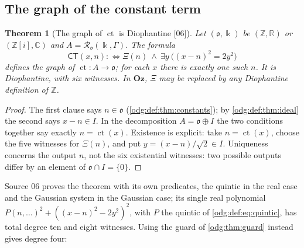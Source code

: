 \documentclass[11pt,oneside]{article}
\numberwithin{equation}{section}
\newtheorem{theorem}{Theorem}[section]
\theoremstyle{definition}
\theoremstyle{remark}
\newcommand{\Oz}{\mathbf{Oz}}
\newcommand{\Z}{\mathbb Z}
\newcommand{\R}{\mathbb R}
\newcommand{\C}{\mathbb C}
\newcommand{\ct}{\operatorname{ct}}
\newcommand{\src}[1]{\textup{\textsf{\small[#1]}}}
\begin{document}
\subsection{The graph of the constant term}

\begin{theorem}[The graph of $\ct$ is Diophantine \src{06}]\label{odg:def:thm:ctgraph}
Let $(\mathfrak o,\Bbbk)$ be $(\Z,\R)$ or $(\Z[i],\C)$ and
$A=\mathcal R_{\mathfrak o}(\Bbbk,\Gamma)$. The formula
\begin{equation}\label{odg:def:eq:ctgraph}
 \mathsf{CT}(x,n):\Longleftrightarrow\Xi(n)\ \wedge\ \exists y\
 \bigl((x-n)^2=2y^2\bigr)
\end{equation}
defines the graph of $\ct:A\to\mathfrak o$; for each $x$ there is exactly one
such $n$. It is Diophantine, with six witnesses. In $\Oz$, $\Xi$ may be
replaced by any Diophantine definition of $\Z$.
\end{theorem}
\begin{proof}
The first clause says $n\in\mathfrak o$ (\cref{odg:def:thm:constants}); by
\cref{odg:def:thm:ideal} the second says $x-n\in I$. In the decomposition
$A=\mathfrak o\oplus I$ the two conditions together say exactly $n=\ct(x)$.
Existence is explicit: take $n=\ct(x)$, choose the five witnesses for
$\Xi(n)$, and put $y=(x-n)/\sqrt2\in I$. Uniqueness concerns the output
$n$, not the six existential witnesses: two possible outputs differ by an
element of $\mathfrak o\cap I=\{0\}$.
\end{proof}

Source 06 proves the theorem with its own predicates, the quintic in the real
case and the Gaussian system in the Gaussian case; its single real polynomial
$P(n,\ldots)^2+((x-n)^2-2y^2)^2$, with $P$ the quintic of
\eqref{odg:def:eq:quintic}, has total degree ten and eight witnesses. Using the
guard of \cref{odg:thm:guard} instead gives degree four:
\end{document}
